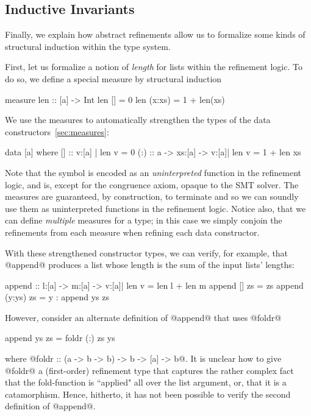 {{{{\subsection{Inductive Invariants}\label{sec:overview:induction}

Finally, we explain how abstract refinements allow us to formalize 
some kinds of structural induction within the type system. 

 First, let us formalize a notion of \emph{length} for
lists within the refinement logic. To do so, we define a special 
 measure by structural induction
%
\begin{code}
  measure len :: [a] -> Int 
    len []      = 0 
    len (x:xs)  = 1 + len(xs)
\end{code}
%
We use the measures to automatically strengthen the 
types of the data constructors~\ref{sec:measures}:
%
\begin{code}
  data [a] where 
    []  :: {v:[a] | len v = 0}
    (:) :: a -> xs:[a] -> {v:[a]| len v = 1 + len xs}
\end{code}
%
Note that the symbol  is encoded as an \emph{uninterpreted}
function in the refinement logic, and is, except for the congruence axiom,
opaque to the SMT solver. The measures are guaranteed, by construction, 
to terminate and so we can soundly use them as uninterpreted 
functions in the refinement logic. Notice also, that we can define 
\emph{multiple} measures for a type; in this case we simply conjoin 
the refinements from each measure when refining each data constructor.

With these strengthened constructor types, we can verify, for example,
that @append@ produces a list whose length is the sum of the input lists'
lengths:
%
\begin{code}
  append :: l:[a] -> m:[a] -> {v:[a]| len v = len l + len m}
  append []     zs = zs
  append (y:ys) zs = y : append ys zs
\end{code}
%
However, consider an alternate definition of @append@ that uses @foldr@
%
\begin{code}
  append ys zs = foldr (:) zs ys 
\end{code}
%
where @foldr :: (a -> b -> b) -> b -> [a] -> b@.
It is unclear how to give @foldr@ a (first-order) refinement type
that captures the rather complex fact that the fold-function 
is ``applied" all over the list argument, or, that it is a catamorphism.
Hence, hitherto, it has not been possible to verify the second definition 
of @append@.


}}}}
